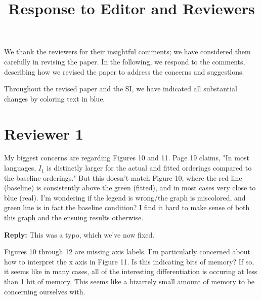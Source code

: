 \documentclass{article}[11pt,a4paper,oneside]
\title{Response to Editor and Reviewers}
\newenvironment{reply}
  {\par\medskip
   \color{blue}%
   \begin{framed}
   \textbf{Reply: }\ignorespaces}
 {\end{framed}
  \medskip}
\begin{document}
\maketitle

We thank the reviewers for their insightful comments; we have considered them carefully in revising the paper. In the following, we respond to the comments, describing how we revised the paper to address the concerns and suggestions.

Throughout the revised paper and the SI, we have indicated all substantial changes by coloring text in blue.

\section{Reviewer 1}



My biggest concerns are regarding Figures 10 and 11. Page 19 claims, "In most languages, $I_1$ is distinctly larger for the actual and fitted orderings compared to the baseline orderings." But this doesn't match Figure 10, where the red line (baseline) is consistently above the green (fitted), and in most cases very close to blue (real). I'm wondering if the legend is wrong/the graph is miscolored, and green line is in fact the baseline condition? I find it hard to make sense of both this graph and the ensuing results otherwise.

\begin{reply}
This was a typo, which we've now fixed.
\end{reply}

Figures 10 through 12 are missing axis labels. I'm particularly concerned about how to interpret the x axis in Figure 11. Is this indicating bits of memory? If so, it seems like in many cases, all of the interesting differentiation is occuring at less than 1 bit of memory. This seems like a bizarrely small amount of memory to be concerning ourselves with.
\end{document}
